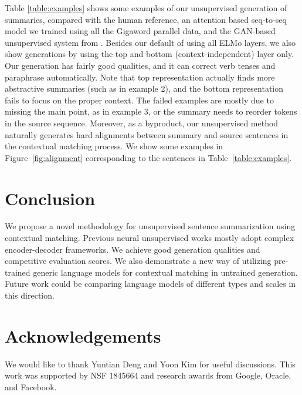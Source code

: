 \documentclass[11pt,a4paper]{article}
\begin{document}
Table \ref{table:examples} shows some examples of our unsupervised generation of summaries, compared with the human reference, an attention based seq-to-seq model we trained using all the Gigaword parallel data, and the GAN-based unsupervised system from \citet{wang2018learning}.
Besides our default of using all ELMo layers, we also show generations by using the top and bottom (context-independent) layer only.
Our generation has fairly good qualities, and it can correct verb tenses and paraphrase automatically. Note that top representation actually finds more abstractive summaries (such as in example 2),
and the bottom representation fails to focus on the proper context.
The failed examples are mostly due to missing the main point,
as in example 3, 
or the summary needs to reorder tokens in the source sequence. Moreover, as a byproduct, our unsupervised method naturally generates hard alignments between summary and source sentences in the contextual matching process. We show some examples in Figure~\ref{fig:alignment} corresponding to the sentences in Table~\ref{table:examples}.

\section{Conclusion}

We propose a novel methodology for unsupervised sentence summarization using contextual matching. Previous neural unsupervised works mostly adopt complex encoder-decoder frameworks. We achieve good generation qualities and competitive evaluation scores. We also demonstrate a new way of utilizing pre-trained generic language models for contextual matching in untrained generation. Future work could be comparing language models of different types and scales in this direction.

\section*{Acknowledgements}

We would like to thank Yuntian Deng and Yoon Kim
for useful discussions. This work was supported 
by NSF 1845664 and research awards from Google, Oracle, and Facebook. 
\end{document}
